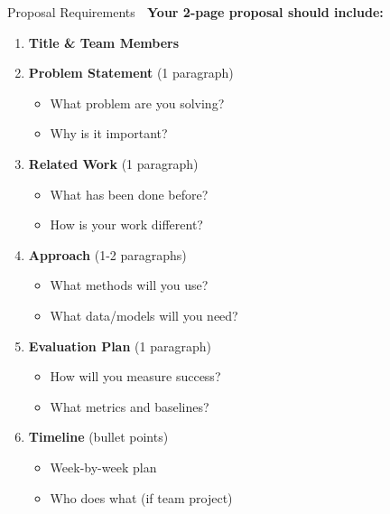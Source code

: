 \documentclass[aspectratio=169]{beamer}
\begin{document}
\begin{frame}[shrink=10]{Proposal Requirements 📝}
\textbf{Your 2-page proposal should include:}

\begin{enumerate}\setlength{\itemsep}{0pt}
    \item \textbf{Title \& Team Members}

    \item \textbf{Problem Statement} (1 paragraph)
    \begin{itemize}\setlength{\itemsep}{0pt}
        \item What problem are you solving?
        \item Why is it important?
    \end{itemize}

    \item \textbf{Related Work} (1 paragraph)
    \begin{itemize}\setlength{\itemsep}{0pt}
        \item What has been done before?
        \item How is your work different?
    \end{itemize}

    \item \textbf{Approach} (1-2 paragraphs)
    \begin{itemize}\setlength{\itemsep}{0pt}
        \item What methods will you use?
        \item What data/models will you need?
    \end{itemize}

    \item \textbf{Evaluation Plan} (1 paragraph)
    \begin{itemize}\setlength{\itemsep}{0pt}
        \item How will you measure success?
        \item What metrics and baselines?
    \end{itemize}

    \item \textbf{Timeline} (bullet points)
    \begin{itemize}\setlength{\itemsep}{0pt}
        \item Week-by-week plan
        \item Who does what (if team project)
    \end{itemize}
\end{enumerate}
\end{frame}
\end{document}
